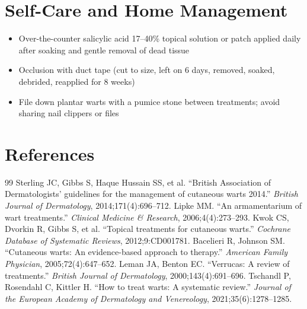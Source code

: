 \section*{Self-Care and Home Management}
\begin{itemize}
  \item Over-the-counter salicylic acid 17--40\% topical solution or patch applied daily after soaking and gentle removal of dead tissue
  \item Occlusion with duct tape (cut to size, left on 6 days, removed, soaked, debrided, reapplied for 8 weeks)
  \item File down plantar warts with a pumice stone between treatments; avoid sharing nail clippers or files
\end{itemize}

\section*{References}
\begin{thebibliography}{99}
 Sterling JC, Gibbs S, Haque Hussain SS, et al. ``British Association of Dermatologists' guidelines for the management of cutaneous warts 2014.'' \textit{British Journal of Dermatology}, 2014;171(4):696--712.
 Lipke MM. ``An armamentarium of wart treatments.'' \textit{Clinical Medicine \& Research}, 2006;4(4):273--293.
 Kwok CS, Dvorkin R, Gibbs S, et al. ``Topical treatments for cutaneous warts.'' \textit{Cochrane Database of Systematic Reviews}, 2012;9:CD001781.
 Bacelieri R, Johnson SM. ``Cutaneous warts: An evidence-based approach to therapy.'' \textit{American Family Physician}, 2005;72(4):647--652.
 Leman JA, Benton EC. ``Verrucas: A review of treatments.'' \textit{British Journal of Dermatology}, 2000;143(4):691--696.
 Tschandl P, Rosendahl C, Kittler H. ``How to treat warts: A systematic review.'' \textit{Journal of the European Academy of Dermatology and Venereology}, 2021;35(6):1278--1285.
\end{thebibliography}
